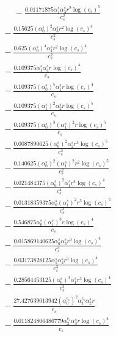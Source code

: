 \documentclass[10pt]{article}
\begin{document}
\begin{align*}
\phantom{R_{2,8}} &\phantom{={}}{}  - \frac{0.01171875 \alpha_{1}^s \alpha_{3}^s r^{2} \log{\left(c_{s} \right)}^{5}}{c_{s}^{2}} \\
&{}  - \frac{0.15625 \left(\alpha_{0}^s\right)^{2} \alpha_{3}^s r^{2} \log{\left(c_{s} \right)}^{4}}{c_{s}^{2}} \\
&{}  - \frac{0.625 \left(\alpha_{0}^s\right)^{4} \alpha_{1}^s r^{2} \log{\left(c_{s} \right)}^{4}}{c_{s}^{2}} \\
&{}  - \frac{0.109375 \alpha_{1}^s \alpha_{4}^s r \log{\left(c_{s} \right)}^{4}}{c_{s}} \\
&{}  - \frac{0.109375 \left(\alpha_{0}^s\right)^{5} \alpha_{1}^s r \log{\left(c_{s} \right)}^{4}}{c_{s}} \\
&{}  - \frac{0.109375 \left(\alpha_{1}^s\right)^{2} \alpha_{2}^s r \log{\left(c_{s} \right)}^{5}}{c_{s}} \\
&{}  - \frac{0.109375 \left(\alpha_{0}^s\right)^{3} \left(\alpha_{1}^s\right)^{2} r \log{\left(c_{s} \right)}^{5}}{c_{s}} \\
&{}  - \frac{0.0087890625 \left(\alpha_{0}^s\right)^{2} \alpha_{2}^s r^{3} \log{\left(c_{s} \right)}^{5}}{c_{s}^{3}} \\
&{}  - \frac{0.140625 \left(\alpha_{0}^s\right)^{2} \left(\alpha_{1}^s\right)^{2} r^{2} \log{\left(c_{s} \right)}^{5}}{c_{s}^{2}} \\
&{}  - \frac{0.021484375 \left(\alpha_{0}^s\right)^{2} \alpha_{1}^s r^{4} \log{\left(c_{s} \right)}^{4}}{c_{s}^{4}} \\
&{}  - \frac{0.01318359375 \alpha_{0}^s \left(\alpha_{1}^s\right)^{2} r^{3} \log{\left(c_{s} \right)}^{5}}{c_{s}^{3}} \\
&{}  - \frac{0.546875 \alpha_{0}^s \left(\alpha_{1}^s\right)^{3} r \log{\left(c_{s} \right)}^{4}}{c_{s}} \\
&{}  - \frac{0.015869140625 \alpha_{0}^s \alpha_{3}^s r^{3} \log{\left(c_{s} \right)}^{4}}{c_{s}^{3}} \\
&{}  - \frac{0.03173828125 \alpha_{1}^s \alpha_{2}^s r^{3} \log{\left(c_{s} \right)}^{4}}{c_{s}^{3}} \\
&{}  - \frac{0.28564453125 \left(\alpha_{0}^s\right)^{3} \alpha_{1}^s r^{3} \log{\left(c_{s} \right)}^{4}}{c_{s}^{3}} \\
&{}  - \frac{27.427639013942 \left(\alpha_{0}^{c_s}\right)^{2} \alpha_{1}^{c_s} \alpha_{2}^s r}{c_{s}} \\
&{}  - \frac{0.011824806486779 \alpha_{2}^{c_s} \alpha_{3}^s r \log{\left(c_{s} \right)}^{4}}{c_{s}} \\

\end{align*}
\end{document}
